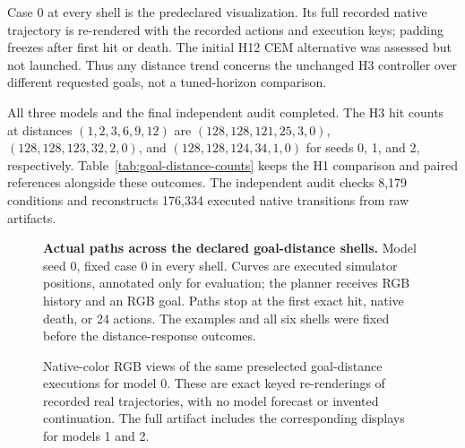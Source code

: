 Case 0 at every shell is the predeclared visualization. Its full recorded native trajectory is
re-rendered with the recorded actions and execution keys; padding freezes after first hit or death.
The initial H12 CEM alternative was assessed but not launched. Thus any distance trend concerns
the unchanged H3 controller over different requested goals, not a tuned-horizon comparison.


All three models and the final independent audit completed. The H3 hit counts at distances
$(1,2,3,6,9,12)$ are $(128,128,121,25,3,0)$, $(128,128,123,32,2,0)$, and
$(128,128,124,34,1,0)$ for seeds 0, 1, and 2, respectively. Table~\ref{tab:goal-distance-counts}
keeps the H1 comparison and paired references alongside these outcomes. The independent audit
checks 8,179 conditions and reconstructs 176,334 executed native transitions from raw artifacts.

\begin{table}[ht]
\centering
\caption{Distance-response exact-hit counts. Initial distance is measured in native three-pixel
cardinal moves. Every cell has denominator 128. The same six shells,
prefixes and controller settings are retained for all models; no pooled binomial interval is used.}
\label{tab:goal-distance-counts}
\end{table}


\begin{figure}[p]
\centering
{}
\caption{\textbf{Actual paths across the declared goal-distance shells.} Model seed 0, fixed case 0
in every shell. Curves are executed simulator positions, annotated only for evaluation; the planner
receives RGB history and an RGB goal. Paths stop at the first exact hit, native death, or 24 actions.
The examples and all six shells were fixed before the distance-response outcomes.}
\label{fig:goal-distance-paths}
\end{figure}

\begin{figure}[p]
\centering
{}
\caption{Native-color RGB views of the same preselected goal-distance executions for model 0.
These are exact keyed re-renderings of recorded real trajectories, with no model forecast or
invented continuation. The full artifact includes the corresponding displays for models 1 and 2.}
\label{fig:goal-distance-rgb}
\end{figure}
